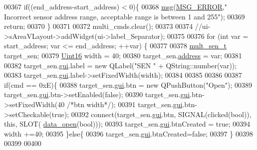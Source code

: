 \begin{DoxyCode}
00367           \textcolor{keywordflow}{if}((end\_address-start\_address) < 0)\{
00368               \hyperlink{a00006_a6134b74dbfffbaf333e169bd09597b53}{msg}(\hyperlink{a00034_aa8a990825a5a62c89d2fb8b08d8a1070}{MSG\_ERROR},\textcolor{stringliteral}{"  Incorrect sensor address range, acceptable range is between 1
       and 255"});
00369              \textcolor{keywordflow}{return};
00370           \}
00371 
00372           multi\_cmds.clear();
00373 
00374           \textcolor{comment}{//ui->sAreaVLayout->addWidget(ui->label\_Separator);}
00375 
00376           \textcolor{keywordflow}{for} (\textcolor{keywordtype}{int} var = start\_address; var <= end\_address; ++var) \{
00377 
00378            \hyperlink{a00001_db/ddf/a00088}{mult\_sen\_t} target\_sen;
00379            \hyperlink{a00001_aae7407b021d43f7193a81a58cfb3e297}{Uint16} width = 40;                   
00380            target\_sen.\hyperlink{a00001_acc8ad431836f7b42742eda4fd49385b2}{address} = var;
00381 
00382            target\_sen.\hyperlink{a00001_a7758f566562596be39abf215046e32f0}{gui}.label = \textcolor{keyword}{new} QLabel(\textcolor{stringliteral}{"SEN "} + QString::number(var));
00383            target\_sen.\hyperlink{a00001_a7758f566562596be39abf215046e32f0}{gui}.label->setFixedWidth(width);
00384 
00385 
00386 
00387            \textcolor{keywordflow}{if}(cmd == 0xE)\{
00388            target\_sen.\hyperlink{a00001_a7758f566562596be39abf215046e32f0}{gui}.btn = \textcolor{keyword}{new} QPushButton(\textcolor{stringliteral}{"Open"});
00389            target\_sen.\hyperlink{a00001_a7758f566562596be39abf215046e32f0}{gui}.btn->setEnabled(\textcolor{keyword}{false});
00390            target\_sen.\hyperlink{a00001_a7758f566562596be39abf215046e32f0}{gui}.btn->setFixedWidth(40 \textcolor{comment}{/*btn width*/});
00391            target\_sen.\hyperlink{a00001_a7758f566562596be39abf215046e32f0}{gui}.btn->setCheckable(\textcolor{keyword}{true});
00392            connect(target\_sen.\hyperlink{a00001_a7758f566562596be39abf215046e32f0}{gui}.btn, SIGNAL(clicked(\textcolor{keywordtype}{bool})), \textcolor{keyword}{this}, SLOT(
      \hyperlink{a00006_a35b895072769864ac42f8cd732267e4b}{data\_open}(\textcolor{keywordtype}{bool})));
00393            target\_sen.\hyperlink{a00001_a7758f566562596be39abf215046e32f0}{gui}.btnCreated = \textcolor{keyword}{true};
00394            width +=40;
00395            \}\textcolor{keywordflow}{else}\{
00396                target\_sen.\hyperlink{a00001_a7758f566562596be39abf215046e32f0}{gui}.btnCreated=\textcolor{keyword}{false};
00397            \}
00398 
00399 
00400 

\end{DoxyCode}

